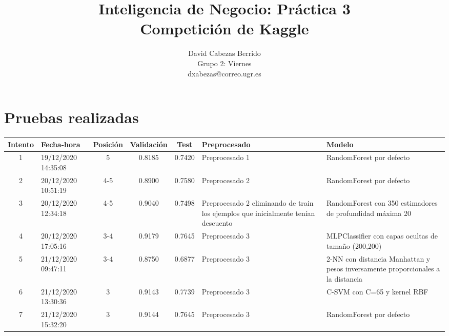 \documentclass[oneside]{book}
\title{\Huge Inteligencia de Negocio: Práctica 3 \\ Competición de Kaggle\vspace{10mm}}
\author{\huge David Cabezas Berrido \vspace{10mm} \\ 
  \huge Grupo 2: Viernes \vspace{10mm} \\ \huge dxabezas@correo.ugr.es \vspace{10mm}}
\begin{document}
\maketitle
\tableofcontents

\pagebreak

\section{Pruebas realizadas}
\setlength\LTleft{-0.5in}
\setlength\LTright{-2in}
\begin{longtable}{|c|C{2.1cm}|c|c|c|C{4cm}|C{6cm}|}
\toprule
Intento & Fecha-hora & Posición & Validación & Test & Preprocesado & Modelo \\

\midrule

1 & 19/12/2020 14:35:08 & 5 & 0.8185 & 0.7420 & Preprocesado 1 & RandomForest por defecto \\

\midrule

2 & 20/12/2020 10:51:19 & 4-5 & 0.8900 & 0.7580 & Preprocesado 2 & RandomForest por defecto \\

\midrule

3 & 20/12/2020 12:34:18 & 4-5 & 0.9040 & 0.7498 & Preprocesado 2 eliminando de train los ejemplos que inicialmente tenían descuento & RandomForest con 350 estimadores de profundidad máxima 20 \\

\midrule

4 & 20/12/2020 17:05:16 & 3-4 & 0.9179 & 0.7645 & Preprocesado 3 & MLPClassifier con capas ocultas de tamaño (200,200) \\

\midrule

5 & 21/12/2020 09:47:11 & 3-4 & 0.8750 & 0.6877 & Preprocesado 3 & 2-NN con distancia Manhattan y pesos inversamente proporcionales a la distancia \\

\midrule

6 & 21/12/2020 13:30:36 & 3 & 0.9143 & 0.7739 & Preprocesado 3 & C-SVM con C=65 y kernel RBF \\

\midrule

7 & 21/12/2020 15:32:20 & 3 & 0.9144 & 0.7645 & Preprocesado 3 & RandomForest por defecto \\


\end{longtable}
\end{document}

